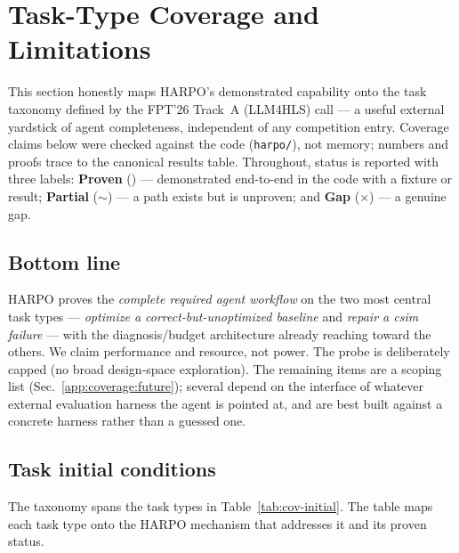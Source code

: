 \section{Task-Type Coverage and Limitations}\label{app:coverage}

This section honestly maps HARPO's demonstrated capability onto the task
taxonomy defined by the FPT'26 Track~A (LLM4HLS) call --- a useful external yardstick
of agent completeness, independent of any competition entry. Coverage claims below
were checked against the code (\texttt{harpo/}), not memory; numbers and proofs
trace to the canonical results table. Throughout, status is reported with three
labels: \textbf{Proven} (\checkmark) --- demonstrated end-to-end in the code with a
fixture or result; \textbf{Partial} (\(\sim\)) --- a path exists but is unproven; and
\textbf{Gap} (\(\times\)) --- a genuine gap.

\subsection{Bottom line}

HARPO proves the \emph{complete required agent workflow} on the two most central
task types --- \emph{optimize a correct-but-unoptimized baseline} and \emph{repair a
csim failure} --- with the diagnosis/budget architecture already reaching toward the
others. We claim performance and resource, not power. The probe is deliberately
capped (no broad design-space exploration). The remaining items are a scoping list
(Sec.~\ref{app:coverage:future}); several depend on the interface of whatever
external evaluation harness the agent is pointed at, and are best built against a
concrete harness rather than a guessed one.

\subsection{Task initial conditions}

The taxonomy spans the task types in Table~\ref{tab:cov-initial}. The table maps
each task type onto the HARPO mechanism that addresses it and its proven
status.

